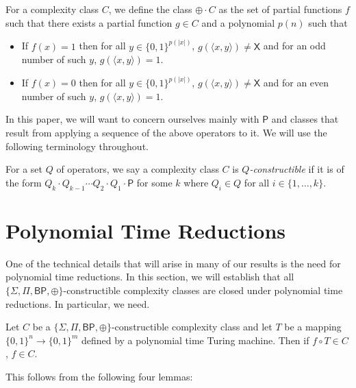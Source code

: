 \documentclass[11pt]{article}
\newcommand{\bp}{\textsf{BP}}
\newcommand{\parity}{\oplus}
\newcommand{\p}{\textsf{P}}
\newcommand{\x}{\textsf{X}}
\begin{document}
\begin{definition}\label{opparity}
For a complexity class $C$, we define the class $\parity\cdot C$ as the set of partial functions $f$ such that there exists a partial function $g \in C$ and a polynomial $p(n)$ such that
\begin{itemize}
\item If $f(x) = 1$ then for all $y \in \{0,1\}^{p(|x|)}$, $g(\langle x, y\rangle) \neq \x$ and for an odd number of such $y$, $g(\langle x,y\rangle) = 1$.
\item If $f(x) = 0$ then for all $y \in \{0,1\}^{p(|x|)}$, $g(\langle x, y\rangle) \neq \x$ and for an even number of such $y$, $g(\langle x,y\rangle) = 1$.
\end{itemize}
\end{definition}

In this paper, we will want to concern ourselves mainly with $\p$ and classes that result from applying a sequence of the above operators to it. We will use the following terminology throughout.
\begin{definition}\label{constructible}
For a set $Q$ of operators, we say a complexity class $C$ is \emph{$Q$-constructible} if it is of the form $Q_k \cdot Q_{k-1} \cdots Q_{2} \cdot Q_1 \cdot \p$ for some $k$ where $Q_i \in Q$ for all $i \in \{1,\ldots,k\}$.
\end{definition}

\section{Polynomial Time Reductions}

One of the technical details that will arise in many of our results is the need for polynomial time reductions. In this section, we will establish that all $\{\Sigma,\Pi,\bp,\parity\}$-constructible complexity classes are closed under polynomial time reductions. In particular, we need.

\begin{prop}
Let $C$ be a $\{\Sigma,\Pi,\bp,\parity\}$-constructible complexity class and let $T$ be a mapping $\{0,1\}^n \to \{0,1\}^m$ defined by a polynomial time Turing machine. Then if $f \circ T \in C$, $f \in C$.
\end{prop}

This follows from the following four lemmas:
\end{document}
